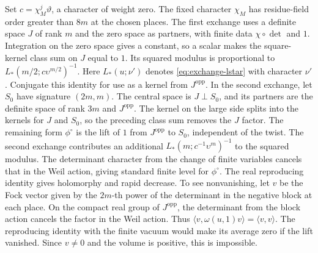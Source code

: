Set \(c=\chi_M^j\vartheta\), a character of weight zero. The fixed
character \(\chi_M\) has residue-field order greater than \(8m\) at the
chosen places. The first exchange uses a definite space \(J\) of rank
\(m\) and the zero space as partners, with finite data \(\chi\circ\det\)
and \(1\). Integration on the zero space gives a constant, so a scalar
makes the square-kernel class sum on \(J\) equal to \(1\). Its squared
modulus is proportional to \(L_*(m/2;c\upsilon^{m/2})^{-1}\).
Here \(L_*(u;\nu')\) denotes \eqref{eq:exchange-lstar} with character \(\nu'\).
Conjugate this identity for use as a kernel from \(J^{\mathrm{opp}}\).
In the second exchange, let \(S_0\) have signature \((2m,m)\).
The central space is \(J\perp S_0\), and its partners are the definite
space of rank \(3m\) and \(J^{\mathrm{opp}}\).
The kernel on the large side splits into the kernels for \(J\) and \(S_0\),
so the preceding class sum removes the \(J\) factor.
The remaining form \(\phi^\circ\) is the lift of \(1\) from \(J^{\mathrm{opp}}\)
to \(S_0\), independent of the twist. The second exchange contributes
an additional \(L_*(m;c^{-1}\upsilon^m)^{-1}\) to the squared modulus.
The determinant character from the change of finite variables cancels
that in the Weil action, giving standard finite level for \(\phi^\circ\).
The real reproducing identity gives holomorphy and rapid decrease.
To see nonvanishing, let \(v\) be the Fock vector given by the
\(2m\)-th power of the determinant in the negative block at each place.
On the compact real group of \(J^{\mathrm{opp}}\), the determinant from the
block action cancels the factor in the Weil action. Thus
\(\langle v,\omega(u,1)v\rangle=\langle v,v\rangle\).
The reproducing identity with the finite vacuum would make its average
zero if the lift vanished. Since \(v\ne0\) and the volume is positive,
this is impossible.

